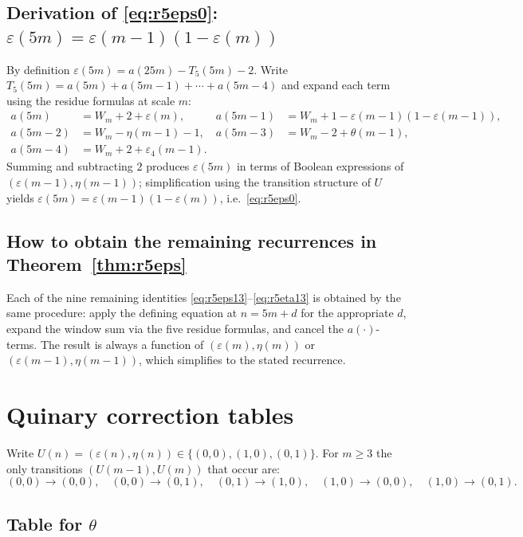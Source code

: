 \documentclass[12pt]{article}
\theoremstyle{definition}
\theoremstyle{remark}
\begin{document}
\subsection*{Derivation of \eqref{eq:r5eps0}: $\varepsilon(5m)=\varepsilon(m-1)(1-\varepsilon(m))$}

By definition $\varepsilon(5m)=a(25m)-T_5(5m)-2$.
Write $T_5(5m)=a(5m)+a(5m-1)+\cdots+a(5m-4)$ and expand each term
using the residue formulas at scale $m$:
\begin{align*}
  a(5m)   &= W_m+2+\varepsilon(m),&
  a(5m-1) &= W_m+1-\varepsilon(m-1)(1-\varepsilon(m-1)), \\
  a(5m-2) &= W_m-\eta(m-1)-1,&
  a(5m-3) &= W_m-2+\theta(m-1),\\
  a(5m-4) &= W_m+2+\varepsilon_4(m-1).
\end{align*}
Summing and subtracting $2$ produces $\varepsilon(5m)$ in terms of Boolean
expressions of $(\varepsilon(m-1),\eta(m-1))$; simplification using the
transition structure of $U$ yields
$\varepsilon(5m)=\varepsilon(m-1)(1-\varepsilon(m))$, i.e.~\eqref{eq:r5eps0}.

\subsection*{How to obtain the remaining recurrences in
Theorem~\ref{thm:r5eps}}

Each of the nine remaining identities
\eqref{eq:r5eps13}--\eqref{eq:r5eta13} is obtained by the same procedure:
apply the defining equation at $n=5m+d$ for the appropriate $d$,
expand the window sum via the five residue formulas, and cancel the
$a(\cdot)$-terms. The result is always a function of $(\varepsilon(m),\eta(m))$
or $(\varepsilon(m-1),\eta(m-1))$, which simplifies to the stated recurrence.

\section{Quinary correction tables}\label{app:r5-tables}

Write $U(n)=(\varepsilon(n),\eta(n))\in\{(0,0),(1,0),(0,1)\}$.
For $m\ge 3$ the only transitions $(U(m-1),U(m))$ that occur are:
\[
(0,0)\to(0,0),\quad (0,0)\to(0,1),\quad (0,1)\to(1,0),\quad
(1,0)\to(0,0),\quad (1,0)\to(0,1).
\]

\subsection*{Table for $\theta$}
\end{document}
